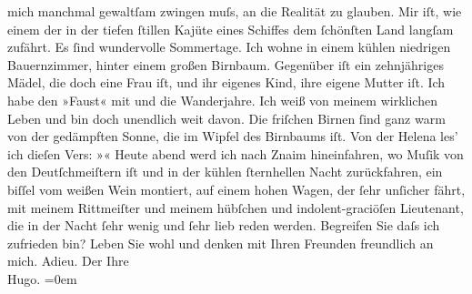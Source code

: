\begin{ledgroupsized}[t]{13cm}
                    mich manchmal gewaltſam zwingen muſs, an die Realität zu glauben. Mir iſt, wie
                    einem der in der tiefen ſtillen Kajüte eines Schiffes dem ſchönſten Land langſam
                    zufährt.\pend
           \pstart
           Es ſind wundervolle Sommertage. Ich wohne in einem kühlen niedrigen Bauernzimmer,
                    hinter einem großen Birnbaum. Gegenüber iſt ein zehnjähriges Mädel, die doch
                    eine Frau iſt, und ihr eigenes Kind, ihre eigene Mutter iſt. Ich habe den
                        »Faust« mit und die Wanderjahre. Ich weiß von meinem {\pb}wirklichen Leben und bin
                    doch unendlich weit davon.\pend
           \pstart
           Die friſchen Birnen ſind ganz warm von der gedämpften Sonne, die im Wipfel des
                    Birnbaums iſt. Von der Helena les’ ich
                    dieſen Vers: »\label{K_L00476_2v}\label{K_L00476_2h}« Heute abend werd ich nach Znaim hineinfahren, wo Muſik von den Deutſchmeiſtern iſt und in der kühlen ſternhellen
                    Nacht zurückfahren, ein biſſel vom weißen Wein montiert, auf einem hohen Wagen,
                    der ſehr {\pb}unſicher fährt, mit
                    meinem Rittmeiſter und meinem hübſchen und indolent-graciöſen Lieutenant, die in
                    der Nacht ſehr wenig und ſehr lieb reden werden. Begreifen Sie daſs ich
                    zufrieden bin?\pend
           \pstart
           Leben Sie wohl und denken mit Ihren Freunden freundlich an mich. Adieu.\pend
           \pstart
           Der Ihre{\\[\baselineskip]}\spacefill\mbox{Hugo.}\pend
           \leftskip=0em{}
         
         \endnumbering{}\end{ledgroupsized}  \newcommand{\dateiname}{L00476}\newcommand{\titel}{Hugo von Hofmannsthal an Arthur Schnitzler, 21. [8. 1895]}\newcommand{\editorInnen}{Martin Anton Müller und Gerd-Hermann Susen}
      